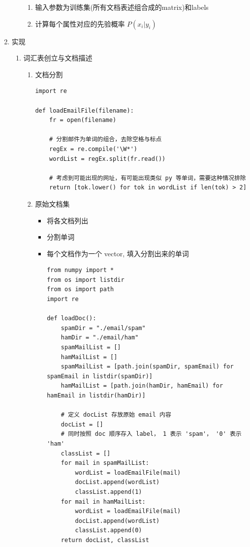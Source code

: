 \documentclass[11pt]{ctexart}
\begin{document}
\begin{enumerate}
\begin{enumerate}
\begin{enumerate}
\item 输入参数为训练集(所有文档表述组合成的matrix)和labels
\item 计算每个属性对应的先验概率 \(P(x_i|y_i)\)
\end{enumerate}
\end{enumerate}
\item 实现
\label{sec:orgheadline40}
\begin{enumerate}
\item 词汇表创立与文档描述
\begin{enumerate}
\item 文档分割
\lstset{language=Python,label= ,caption= ,captionpos=b,numbers=none}
\begin{lstlisting}
import re

def loadEmailFile(filename):
    fr = open(filename)

    # 分割邮件为单词的组合，去除空格与标点
    regEx = re.compile('\W*')
    wordList = regEx.split(fr.read())

    # 考虑到可能出现的网址，有可能出现类似 py 等单词，需要这种情况排除
    return [tok.lower() for tok in wordList if len(tok) > 2]
\end{lstlisting}

\item 原始文档集
\begin{itemize}
\item 将各文档列出

\item 分割单词

\item 每个文档作为一个 vector, 填入分割出来的单词

\lstset{language=Python,label= ,caption= ,captionpos=b,numbers=none}
\begin{lstlisting}
from numpy import *
from os import listdir
from os import path
import re

def loadDoc():
    spamDir = "./email/spam"
    hamDir = "./email/ham"
    spamMailList = []
    hamMailList = []
    spamMailList = [path.join(spamDir, spamEmail) for spamEmail in listdir(spamDir)]
    hamMailList = [path.join(hamDir, hamEmail) for hamEmail in listdir(hamDir)]

    # 定义 docList 存放原始 email 内容
    docList = []
    # 同时按照 doc 顺序存入 label， 1 表示 'spam'， '0' 表示 'ham'
    classList = []
    for mail in spamMailList:
        wordList = loadEmailFile(mail)
        docList.append(wordList)
        classList.append(1)
    for mail in hamMailList:
        wordList = loadEmailFile(mail)
        docList.append(wordList)
        classList.append(0)
    return docList, classList
\end{lstlisting}
\end{itemize}


\end{enumerate}
\end{enumerate}
\end{enumerate}
\end{document}
